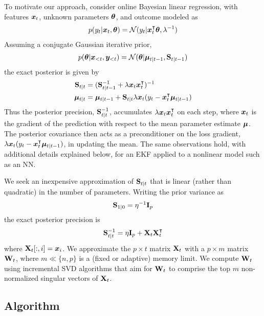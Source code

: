 To motivate our approach, consider online Bayesian linear regression, with features ${\bm{x}}_t$, unknown parameters ${\bm{\theta}}$, and outcome modeled as
\begin{align}
    p(y_t|{\bm{x}}_t,{\bm{\theta}}) = \mathcal{N}(y_t|{\bm{x}}_t^\intercal{\bm{\theta}},\lambda^{-1})
\end{align}
Assuming a conjugate Gaussian iterative prior,
\begin{align}
    p({\bm{\theta}}|{\bm{x}}_{<t},{\bm{y}}_{<t}) = \mathcal{N}({\bm{\theta}}|\boldsymbol{\mu}_{t|t-1},\mathbf{S}_{t|t-1})
\end{align}
the exact posterior is given by
\begin{align}
    \mathbf{S}_{t|t} &= (\mathbf{S}_{t|t-1}^{-1} + \lambda{\bm{x}}_t{\bm{x}}_t^\intercal)^{-1} \\
    \boldsymbol{\mu}_{t|t} &= \boldsymbol{\mu}_{t|t-1} + \mathbf{S}_{t|t}\lambda{\bm{x}}_t (y_t-{\bm{x}}_t^\intercal\boldsymbol{\mu}_{t|t-1})
\end{align}
Thus the posterior precision, $\mathbf{S}_{t|t}^{-1}$, accumulates $\lambda{\bm{x}}_t{\bm{x}}_t^\intercal$ on each step, where ${\bm{x}}_t$ is the gradient of the prediction with respect to the mean parameter estimate $\boldsymbol{\mu}$. The posterior covariance then acts as a preconditioner on the loss gradient, $\lambda{\bm{x}}_t (y_t-{\bm{x}}_t^\intercal\boldsymbol{\mu}_{t|t-1})$, in updating the mean. The same observations hold, with additional details explained below, for an EKF applied to a nonlinear model such as an NN.

We seek an inexpensive approximation of $\mathbf{S}_{t|t}$ that is linear (rather than quadratic) in the number of parameters. Writing the prior variance as 
\begin{align}
    \mathbf{S}_{1|0} = \eta^{-1}\mathbf{I}_p
\end{align}
the exact posterior precision is
\begin{align}
    \mathbf{S}_{t|t}^{-1} = \eta\mathbf{I}_p + \mathbf{X}_t\mathbf{X}_t^\intercal
\end{align}
where $\mathbf{X}_t[:,i]={\bm{x}}_i$. We approximate the $p\times t$ matrix $\mathbf{X}_t$ with a $p\times m$ matrix $\mathbf{W}_t$, where $m\ll \{n,p\}$ is a (fixed or adaptive) memory limit. We compute $\mathbf{W}_t$ using incremental SVD algorithms that aim for $\mathbf{W}_t$ to comprise the top $m$ non-normalized singular vectors of $\mathbf{X}_t$.

\subsection{Algorithm}

